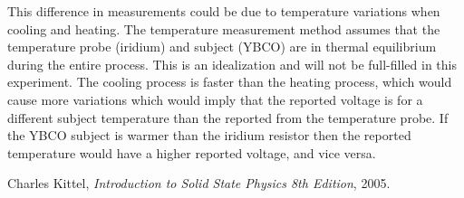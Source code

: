 \documentclass[a4paper,twoside=false,abstract=false,numbers=noenddot,
titlepage=false,headings=small,parskip=half,version=last]{scrartcl}
\begin{document}
This difference in measurements could be due to temperature variations when cooling and heating.
The temperature measurement method assumes that the temperature probe (iridium)
and subject (YBCO) are in thermal equilibrium during the entire process. This
is an idealization and will not be full-filled in this experiment.
The cooling process is faster than the heating process, which would cause more
variations which would imply that the reported voltage is for a different
subject temperature than the reported from the temperature probe.
If the YBCO subject is warmer than the iridium resistor then the reported
temperature would have a higher reported voltage, and vice versa.

\begin{thebibliography}{1}
        Charles Kittel,
        {\em Introduction to Solid State Physics 8th Edition},
        2005.
\end{thebibliography}
\end{document}
